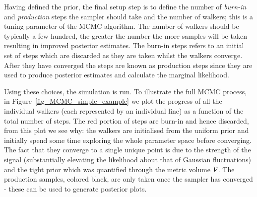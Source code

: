 \documentclass[aps, prd, twocolumn, superscriptaddress, floatfix, showpacs, nofootinbib, longbibliography]{revtex4-1}
\begin{document}
Having defined the prior, the final setup step is to define the number of
\emph{burn-in} and \emph{production} steps the sampler should take and the
number of walkers; this is a tuning parameter of the MCMC algorithm. The number
of walkers should be typically a few hundred, the greater the number the more
samples will be taken resulting in improved posterior estimates. The burn-in
steps refers to an initial set of steps which are discarded as they are taken
whilst the walkers converge. After they have converged the steps are known as
production steps since they are used to produce posterior estimates and
calculate the marginal likelihood.

Using these choices, the simulation is run. To illustrate the full MCMC
process, in Figure~\ref{fig_MCMC_simple_example} we plot the progress of all
the individual walkers (each represented by an individual line) as a function
of the total number of steps. The red portion of steps are burn-in and hence
discarded, from this plot we see why: the walkers are initialised from the
uniform prior and initially spend some time exploring the whole parameter space
before converging. The fact that they converge to a single unique point is due
to the strength of the signal (substantially elevating the likelihood about
that of Gaussian fluctuations) and the tight prior which was quantified through the
metric volume $\mathcal{V}$. The production samples, colored black, are only taken once
the sampler has converged - these can be used to generate posterior plots.
\end{document}
